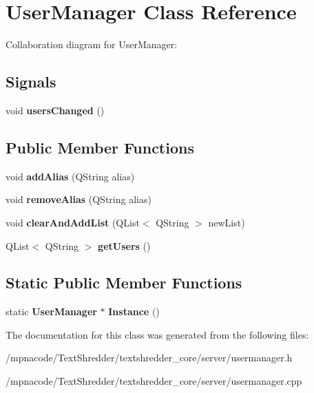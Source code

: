 \section{UserManager Class Reference}
\label{class_user_manager}


Collaboration diagram for UserManager:
\subsection*{Signals}
\begin{DoxyCompactItemize}
\item 
void {\bfseries usersChanged} ()\label{class_user_manager_ac7774b1192a8db594517cf631fe0c08a}

\end{DoxyCompactItemize}
\subsection*{Public Member Functions}
\begin{DoxyCompactItemize}
\item 
void {\bfseries addAlias} (QString alias)\label{class_user_manager_a780d759b88a1df9070237c4da773f715}

\item 
void {\bfseries removeAlias} (QString alias)\label{class_user_manager_aa095606be17b14abee1eb54571f7e910}

\item 
void {\bfseries clearAndAddList} (QList$<$ QString $>$ newList)\label{class_user_manager_a4987a113b6fa6ce064813eac0d6b039b}

\item 
QList$<$ QString $>$ {\bfseries getUsers} ()\label{class_user_manager_ab575adde2f4f4702fb9e88c6cac27be2}

\end{DoxyCompactItemize}
\subsection*{Static Public Member Functions}
\begin{DoxyCompactItemize}
\item 
static {\bf UserManager} $\ast$ {\bfseries Instance} ()\label{class_user_manager_a6effcea7c87ee21cf1335219fd2f6a52}

\end{DoxyCompactItemize}


The documentation for this class was generated from the following files:\begin{DoxyCompactItemize}
\item 
/mpnacode/TextShredder/textshredder\_\-core/server/usermanager.h\item 
/mpnacode/TextShredder/textshredder\_\-core/server/usermanager.cpp\end{DoxyCompactItemize}
